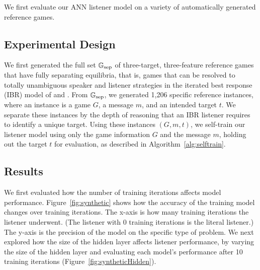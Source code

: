 We first evaluate our ANN listener model on a variety of automatically
generated reference games.

\subsection{Experimental Design}

We first generated the full set $\mathbb{G}_{\text{sep}}$ of three-target, three-feature
reference games that have fully separating equilibria, that is, games
that can be resolved to totally unambiguous speaker and listener
strategies in the iterated best response (IBR) model of
\citet{Franke09DISS} and \citet{Jaeger:2007,Jaeger:2011}. From
$\mathbb{G}_{\text{sep}}$, we generated 1,206 specific reference instances, where an
instance is a game $G$, a message $m$, and an intended target $t$. We
separate these instances by the depth of reasoning that an IBR
listener requires to identify a unique target. Using these instances
$(G, m, t)$, we self-train our listener model using only the game
information $G$ and the message $m$, holding out the target $t$ for
evaluation, as described in Algorithm~\ref{alg:selftrain}.

\subsection{Results}

We first evaluated how the number of training iterations affects model
performance. Figure~\ref{fig:synthetic} shows how the accuracy of the
training model changes over training iterations. The x-axis is how
many training iterations the listener underwent. (The listener with 0
training iterations is the literal listener.) The y-axis is the
precision of the model on the specific type of problem. We next
explored how the size of the hidden layer affects listener
performance, by varying the size of the hidden layer and evaluating
each model's performance after 10 training iterations
(Figure~\ref{fig:syntheticHidden}).


%

